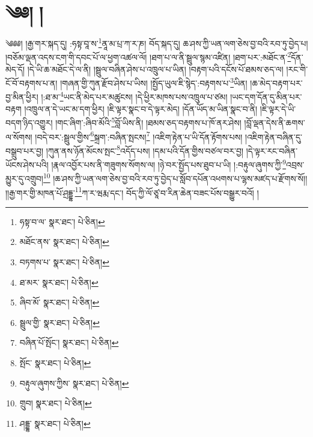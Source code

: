 \setcounter{footnote}{0} 
\chapter{༄༅། །}༄༅༅། །རྒྱ་གར་སྐད་དུ། :ཧསྟ་བཱ་ས་\footnote{ཧསྟ་བ་ལ་  སྣར་ཐང་།  པེ་ཅིན། }ནཱ་མ་པྲ་ཀ་ར་ཎ། བོད་སྐད་དུ། ཆ་ཤས་ཀྱི་ཡན་ལག་ཅེས་བྱ་བའི་རབ་ཏུ་བྱེད་པ། །བཅོམ་ལྡན་འདས་ངག་གི་དབང་པོ་ལ་ཕྱག་འཚལ་ལོ། །ཐག་པ་ལ་ནི་སྦྲུལ་སྙམ་འཛིན། །ཐག་པར་:མཐོང་ན་\footnote{མཐོང་ནས་  སྣར་ཐང་།  པེ་ཅིན། }དོན་མེད་དོ། །དེ་ཡི་ཆ་མཐོང་དེ་ལ་ནི། །སྦྲུལ་བཞིན་ཤེས་པ་འཁྲུལ་པ་ཡིན། །བརྟག་པའི་དངོས་པོ་ཐམས་ཅད་ལ། །རང་གི་ངོ་བོ་བརྟགས་པ་ན། །གཞན་གྱི་ཀུན་རྫོབ་ཤེས་པ་ཡིས། །སྤྱོད་ཡུལ་ཇི་སྙེད་:བརྟགས་པ་\footnote{བཏགས་པ་  སྣར་ཐང་།  པེ་ཅིན། }ཡིན། །ཆ་མེད་བརྟག་པར་བྱ་མིན་ཕྱིར། །:ཐ་མ་\footnote{ཐ་མར་  སྣར་ཐང་།  པེ་ཅིན། }ཡང་ནི་མེད་པར་མཚུངས། །དེ་ཕྱིར་མཁས་པས་འཁྲུལ་པ་ཙམ། །ཡང་དག་དོན་དུ་མིན་པར་བརྟག །འཁྲུལ་ན་དེ་ཡང་མ་དག་ཕྱིར། །ཇི་ལྟར་སྣང་བ་དེ་ལྟར་མེད། །དོན་ཡོད་མ་ཡིན་སྣང་བ་ནི། །ཇི་ལྟར་དེ་ཡི་བདག་ཉིད་འགྱུར། །གང་ཞིག་:ཞིབ་མོའི་\footnote{ཞིབ་མོ་  སྣར་ཐང་།  པེ་ཅིན། }བློ་ཡིས་ནི། །ཐམས་ཅད་བརྟགས་པ་ཁོ་ནར་ཤེས། །བློ་ལྡན་དེས་ནི་ཆགས་ལ་སོགས། །བདེ་བར་:སྦྲུལ་གྱིས་\footnote{སྦྲུལ་གྱི་  སྣར་ཐང་།  པེ་ཅིན། }སྐྲག་:བཞིན་སྤངས།\footnote{བཞིན་པོ་སྤོང་།  སྣར་ཐང་།  པེ་ཅིན། } །འཇིག་རྟེན་པ་ཡི་དོན་རྟོགས་པས། །འཇིག་རྟེན་བཞིན་དུ་བསྒྲུབ་པར་བྱ། །ཀུན་ནས་ཉོན་མོངས་སྤང་\footnote{སྤོང་  སྣར་ཐང་།  པེ་ཅིན། }འདོད་པས། །དམ་པའི་དོན་གྱིས་བཙལ་བར་བྱ། །དེ་ལྟར་རང་བཞིན་ཡོངས་ཤེས་པའི། །རྣལ་འབྱོར་པས་ནི་གཟུགས་སོགས་ལ། །ཉེ་བར་སྤྱོད་པས་ཐུབ་པ་ཡི། །:བརྟུལ་ཞུགས་ཀྱི་\footnote{བརྟུལ་ཞུགས་ཀྱིས་  སྣར་ཐང་།  པེ་ཅིན། }འབྲས་མྱུར་དུ་འགྲུབ།\footnote{གྲུབ།  སྣར་ཐང་།  པེ་ཅིན། } །ཆ་ཤས་ཀྱི་ཡན་ལག་ཅེས་བྱ་བའི་རབ་ཏུ་བྱེད་པ་སློབ་དཔོན་འཕགས་པ་ལྷས་མཛད་པ་རྫོགས་སོ།། །།རྒྱ་གར་གྱི་མཁན་པོ་ཤྲདྡྷ་\footnote{ཤདྡྷ་  སྣར་ཐང་།  པེ་ཅིན། }ཀ་ར་ཝརྨ་དང་། བོད་ཀྱི་ལོ་ཙཱ་བ་རིན་ཆེན་བཟང་པོས་བསྒྱུར་བའོ། ། 